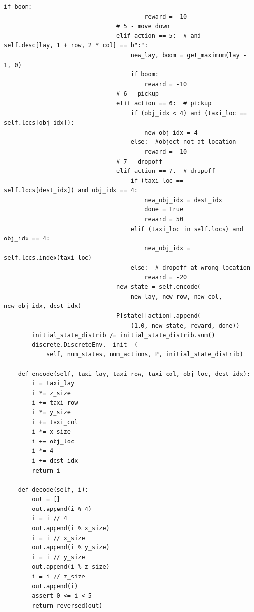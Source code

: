 \documentclass[a4paper]{report}
\theoremstyle{definition}
\theoremstyle{plain}
\theoremstyle{remark}
\theoremstyle{remark}
\theoremstyle{definition}
\begin{document}
\begin{lstlisting}[label=some-code, caption=labyrinth.py]
                                    if boom:
                                        reward = -10
                                # 5 - move down
                                elif action == 5:  # and self.desc[lay, 1 + row, 2 * col] == b":":
                                    new_lay, boom = get_maximum(lay - 1, 0)
                                    if boom:
                                        reward = -10
                                # 6 - pickup
                                elif action == 6:  # pickup
                                    if (obj_idx < 4) and (taxi_loc == self.locs[obj_idx]):
                                        new_obj_idx = 4
                                    else:  #object not at location
                                        reward = -10
                                # 7 - dropoff
                                elif action == 7:  # dropoff
                                    if (taxi_loc == self.locs[dest_idx]) and obj_idx == 4:
                                        new_obj_idx = dest_idx
                                        done = True
                                        reward = 50
                                    elif (taxi_loc in self.locs) and obj_idx == 4:
                                        new_obj_idx = self.locs.index(taxi_loc)
                                    else:  # dropoff at wrong location
                                        reward = -20
                                new_state = self.encode(
                                    new_lay, new_row, new_col, new_obj_idx, dest_idx)
                                P[state][action].append(
                                    (1.0, new_state, reward, done))
        initial_state_distrib /= initial_state_distrib.sum()
        discrete.DiscreteEnv.__init__(
            self, num_states, num_actions, P, initial_state_distrib)

    def encode(self, taxi_lay, taxi_row, taxi_col, obj_loc, dest_idx):
        i = taxi_lay
        i *= z_size
        i += taxi_row
        i *= y_size
        i += taxi_col
        i *= x_size
        i += obj_loc
        i *= 4
        i += dest_idx
        return i

    def decode(self, i):
        out = []
        out.append(i % 4)
        i = i // 4
        out.append(i % x_size)
        i = i // x_size
        out.append(i % y_size)
        i = i // y_size
        out.append(i % z_size)
        i = i // z_size
        out.append(i)
        assert 0 <= i < 5
        return reversed(out)


\end{lstlisting}
\end{document}
